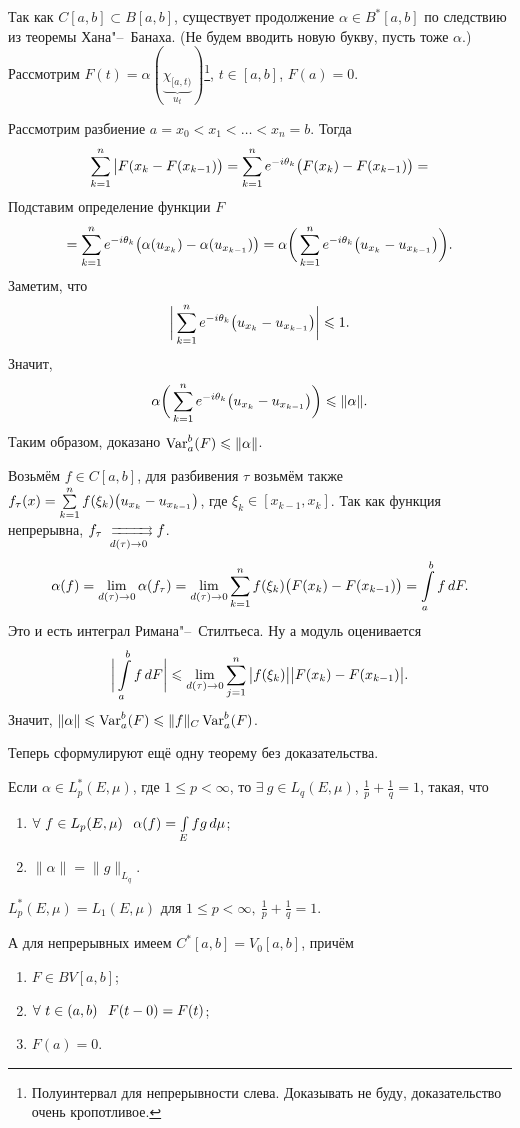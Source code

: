 \begin{Proof}
  Так как $C[a,b]\subset B[a,b]$, существует продолжение $\alpha\in B^*[a,b]$ по следствию из теоремы Хана"--~Банаха. (Не будем вводить новую букву, пусть тоже $\alpha$.) Рассмотрим $F(t) = \alpha\left(\underbrace{\chi_{[a,t)}}_{u_t}\right)$\footnote{Полуинтервал для непрерывности слева. Доказывать не буду, доказательство очень кропотливое.}, $t\in[a,b]$, $F(a) = 0$.

Рассмотрим разбиение $a=x_0<x_1<\dots<x_n = b$. Тогда
\[
  \sum\limits_{k = 1}^{n}\big|F(x_k-F(x_{k-1})\big) = \sum\limits_{k = 1}^{n} e^{-i\theta_k } \big(F(x_k)-F(x_{k-1})\big) = 
\]
Подставим определение функции $F$
\[
 = \sum\limits_{k = 1}^{n} e^{-i\theta_k}\big(\alpha(u_{x_k}) - \alpha(u_{x_{k-1}})\big) = \alpha\bigg(\sum\limits_{k = 1}^{n} e^{-i\theta_k}\big(u_{x_k} - u_{x_{k-1}}\big)\bigg).
\]
Заметим, что
\[
  \bigg|\sum\limits_{k = 1}^{n} e^{-i\theta_k}\big(u_{x_k} - u_{x_{k-1}}\big)\bigg|\leqslant 1.
\]
Значит, 
\[
  \alpha\bigg(\sum\limits_{k = 1}^{n} e^{-i\theta_k}\big(u_{x_k} - u_{x_{k-1}}\big)\bigg)\leqslant \|\alpha\|.
\]
Таким образом, доказано $\operatorname{Var}\limits_a^b(F)\leqslant \|\alpha\|$.

Возьмём $f\in C[a,b]$, для разбивения $\tau$ возьмём также $f_\tau(x) = \sum\limits_{k = 1}^{n} f(\xi_k)\big(u_{x_k} - u_{x_{k-1}}\big)$, где $\xi_k\in[x_{k-1},x_k]$. Так как функция непрерывна, $f_\tau\rsH[]{d(\tau)\to0}f$.
\[
  \alpha(f) = \lim\limits_{d(\tau)\rightarrow0}\alpha(f_\tau) = \lim\limits_{d(\tau)\rightarrow0} \sum\limits_{k = 1}^{n} f(\xi_k)\big(F(x_k) - F(x_{k-1})\big) = \int\limits_a^b f\,dF.
\] 
Это и есть интеграл Римана"--~Стилтьеса. Ну а модуль оценивается
\[
  \bigg|\int\limits_a^b f\,dF\bigg|\leqslant \lim\limits_{d(\tau)\rightarrow0}\sum\limits_{j = 1}^{n}\big|f(\xi_k)\big|\big|F(x_k)-F(x_{k-1})\big|.
\]
Значит, $\|\alpha\|\leqslant \operatorname{Var}\limits_a^b (F)\leqslant \|f\|_C\operatorname{Var}\limits_a^b(F)$.
\end{Proof}

Теперь сформулируют ещё одну теорему без доказательства.
\begin{The}[Рисса]
  Если $\alpha\in L^*_p(E,\mu)$, где $1\le p<\infty$, то $\exists\ g\in L_q(E,\mu)$, $\frac1p+\frac1q =1$, такая, что
\begin{enumerate}
  \item $\forall\ f\in L_p(E,\mu)\pau \alpha(f) = \I E{fg}$;
  \item $\|\alpha\| = \|g\|_{L_q}$.
\end{enumerate}
\end{The}

\begin{Sl}
  $L^*_p(E,\mu) = L_1(E,\mu)$ для $1\le p<\infty,\ \frac1p+\frac1q=1$.
\end{Sl}

А для непрерывных имеем $C^*[a,b] = V_0[a,b]$, причём
\begin{enumerate}
  \item $F\in BV[a,b]$;
  \item $\forall\ t\in (a,b)\pau F(t-0) = F(t)$;
  \item $F(a) =0$.
\end{enumerate}
